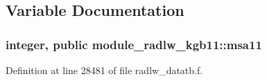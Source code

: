\subsection{Variable Documentation}
\subsubsection[{\texorpdfstring{msa11}{msa11}}]{\setlength{\rightskip}{0pt plus 5cm}integer, public module\+\_\+radlw\+\_\+kgb11\+::msa11}\hypertarget{namespacemodule__radlw__kgb11_afd15a7b87b3d49c53c12e023c604b360}{}\label{namespacemodule__radlw__kgb11_afd15a7b87b3d49c53c12e023c604b360}


Definition at line 28481 of file radlw\+\_\+datatb.\+f.


